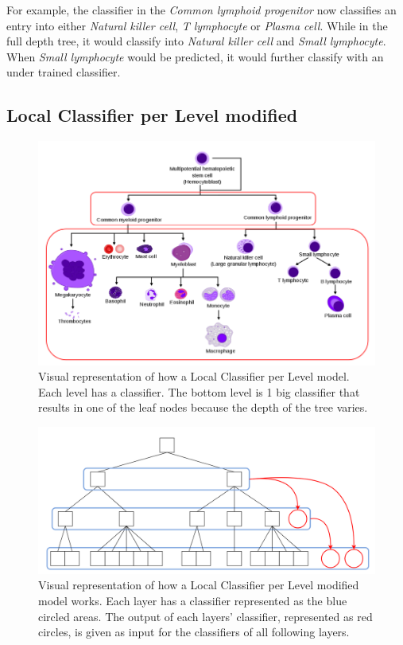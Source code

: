 \documentclass{article}
\begin{document}
For example, the classifier in the \textit{Common lymphoid progenitor} now classifies an entry into either \textit{Natural killer cell}, \textit{T lymphocyte} or \textit{Plasma cell}. While in the full depth tree, it would classify into \textit{Natural killer cell} and \textit{Small lymphocyte}. When  \textit{Small lymphocyte} would be predicted, it would further classify with an under trained classifier.

\subsection{Local Classifier per Level modified}
\begin{figure}[ht]
\vskip 0.2in
\begin{center}
\centerline{\includegraphics[width=\columnwidth]{images/lcl.png}}
\caption{Visual representation of how a Local Classifier per Level model. Each level has a classifier. The bottom level is 1 big classifier that results in one of the leaf nodes because the depth of the tree varies.}
\label{LCL}
\end{center}
\vskip -0.2in
\end{figure}

\begin{figure}[ht]
\vskip 0.2in
\begin{center}
\centerline{\includegraphics[width=5in]{images/lcl-modified.png}}
\caption{Visual representation of how a Local Classifier per Level modified model works. Each layer has a classifier represented as the blue circled areas. The output of each layers' classifier, represented as red circles, is given as input for the classifiers of all following layers.}
\label{LCL-modified}
\end{center}
\vskip -0.2in
\end{figure}
\end{document}

